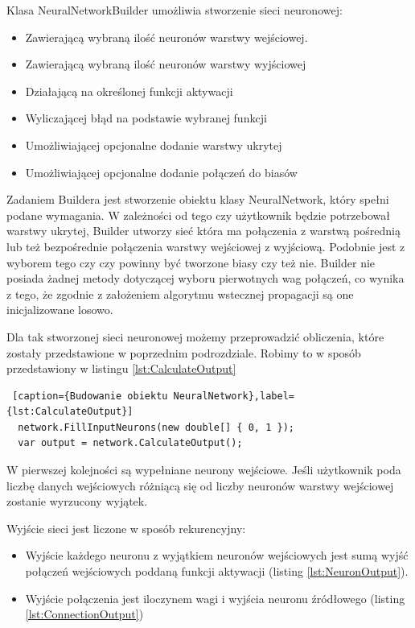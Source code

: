 Klasa NeuralNetworkBuilder umożliwia stworzenie sieci neuronowej:
\begin{itemize}
  \item Zawierającą wybraną ilość neuronów warstwy wejściowej.
  \item Zawierającą wybraną ilość neuronów warstwy wyjściowej
  \item Działającą na określonej funkcji aktywacji
  \item Wyliczającej błąd na podstawie wybranej funkcji
  \item Umożliwiającej opcjonalne dodanie warstwy ukrytej
  \item Umożliwiającej opcjonalne dodanie połączeń do biasów
\end{itemize}

Zadaniem Buildera jest stworzenie obiektu klasy NeuralNetwork, który spełni podane wymagania. 
W zależności od tego czy użytkownik będzie potrzebował warstwy ukrytej, Builder utworzy sieć która ma połączenia z warstwą pośrednią lub też bezpośrednie połączenia warstwy wejściowej z wyjściową.
Podobnie jest z wyborem tego czy czy powinny być tworzone biasy czy też nie.
Builder nie posiada żadnej metody dotyczącej wyboru pierwotnych wag połączeń, co wynika z tego, że zgodnie z założeniem algorytmu wstecznej propagacji są one inicjalizowane losowo.

Dla tak stworzonej sieci neuronowej możemy przeprowadzić obliczenia, które zostały przedstawione w poprzednim podrozdziale.
Robimy to w sposób przedstawiony w listingu \ref{lst:CalculateOutput}

\begin{lstlisting} [caption={Budowanie obiektu NeuralNetwork},label={lst:CalculateOutput}]
  network.FillInputNeurons(new double[] { 0, 1 });
  var output = network.CalculateOutput();
\end{lstlisting}

W pierwszej kolejności są wypełniane neurony wejściowe.
Jeśli użytkownik poda liczbę danych wejściowych różniącą się od liczby neuronów warstwy wejściowej zostanie wyrzucony wyjątek.

Wyjście sieci jest liczone w sposób rekurencyjny:
\begin{itemize}
  \item Wyjście każdego neuronu z wyjątkiem neuronów wejściowych jest sumą wyjść połączeń wejściowych poddaną funkcji aktywacji (listing \ref{lst:NeuronOutput}).
  \item Wyjście połączenia jest iloczynem wagi i wyjścia neuronu źródłowego (listing \ref{lst:ConnectionOutput})
\end{itemize}

